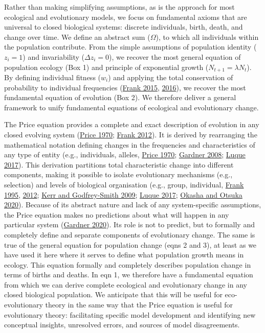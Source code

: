 \documentclass[
]{article}
\begin{document}
Rather than making simplifying assumptions, as is the approach for most
ecological and evolutionary models, we focus on fundamental axioms that
are universal to closed biological systems: discrete individuals, birth,
death, and change over time. We define an abstract sum (\(\Omega\)), to
which all individuals within the population contribute. From the simple
assumptions of population identity (\(z_{i} = 1\)) and invariability
(\(\Delta z_{i} = 0\)), we recover the most general equation of
population ecology (Box 1) and principle of exponential growth
(\(N_{t+1} = \lambda N_{t}\)). By defining individual fitness
(\(w_{i}\)) and applying the total conservation of probability to
individual frequencies (\protect\hyperlink{ref-Frank2015}{Frank 2015},
\protect\hyperlink{ref-Frank2016}{2016}), we recover the most
fundamental equation of evolution (Box 2). We therefore deliver a
general framework to unify fundamental equations of ecological and
evolutionary change.

The Price equation provides a complete and exact description of
evolution in any closed evolving system
(\protect\hyperlink{ref-Price1970}{Price 1970};
\protect\hyperlink{ref-Frank2012}{Frank 2012}). It is derived by
rearranging the mathematical notation defining changes in the
frequencies and characteristics of any type of entity (e.g.,
individuals, alleles, \protect\hyperlink{ref-Price1970}{Price 1970};
\protect\hyperlink{ref-Gardner2008}{Gardner 2008};
\protect\hyperlink{ref-Luque2016}{Luque 2017}). This derivation
partitions total characteristic change into different components, making
it possible to isolate evolutionary mechanisms (e.g., selection) and
levels of biological organisation (e.g., group, individual,
\protect\hyperlink{ref-Frank1995}{Frank 1995},
\protect\hyperlink{ref-Frank2012}{2012};
\protect\hyperlink{ref-Kerr2009}{Kerr and Godfrey-Smith 2009};
\protect\hyperlink{ref-Luque2016}{Luque 2017};
\protect\hyperlink{ref-Okasha2020}{Okasha and Otsuka 2020}). Because of
its abstract nature and lack of any system-specific assumptions, the
Price equation makes no predictions about what will happen in any
particular system (\protect\hyperlink{ref-Gardner2020}{Gardner 2020}).
Its role is not to predict, but to formally and completely define and
separate components of evolutionary change. The same is true of the
general equation for population change (eqns 2 and 3), at least as we
have used it here where it serves to define what population growth means
in ecology. This equation formally and completely describes population
change in terms of births and deaths. In eqn 1, we therefore have a
fundamental equation from which we can derive complete ecological and
evolutionary change in any closed biological population. We anticipate
that this will be useful for eco-evolutionary theory in the same way
that the Price equation is useful for evolutionary theory: facilitating
specific model development and identifying new conceptual insights,
unresolved errors, and sources of model disagreements.
\end{document}
